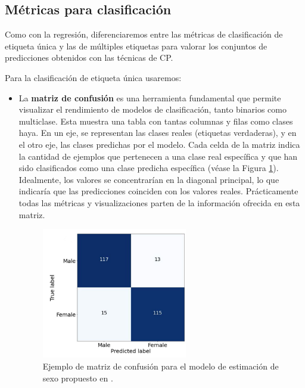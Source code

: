 
\subsection{Métricas para clasificación}

Como con la regresión, diferenciaremos entre las métricas de clasificación de etiqueta única y las de múltiples etiquetas para valorar los conjuntos de predicciones obtenidos con las técnicas de \acrshort{CP}.

Para la clasificación de etiqueta única usaremos: 

\begin{itemize}

    \item La \textbf{matriz de confusión} es una herramienta fundamental que permite visualizar el rendimiento de modelos de clasificación, tanto binarios como multiclase. Esta muestra una tabla con tantas columnas y filas como clases haya. En un eje, se representan las clases reales (etiquetas verdaderas), y en el otro eje, las clases predichas por el modelo. Cada celda de la matriz indica la cantidad de ejemplos que pertenecen a una clase real específica y que han sido clasificados como una clase predicha específica (véase la Figura \ref{fig:conf_matrix_binary}). Idealmente, los valores se concentrarían en la diagonal principal, lo que indicaría que las predicciones coinciden con los valores reales. Prácticamente todas las métricas y visualizaciones parten de la información ofrecida en esta matriz. 

    \begin{figure}[htbp]
        \centering
        \includegraphics[width=0.6\textwidth]{capitulos/cap_02/imagenes/confusion_matrix_binary.png}
        \caption[
            Ejemplo de matriz de confusión para un modelo de estimación de sexo.
        ]{
            Ejemplo de matriz de confusión para el modelo de estimación de sexo propuesto en \cite{bidmos2023}.
        } 
        \label{fig:conf_matrix_binary}
    \end{figure}


\end{itemize}
